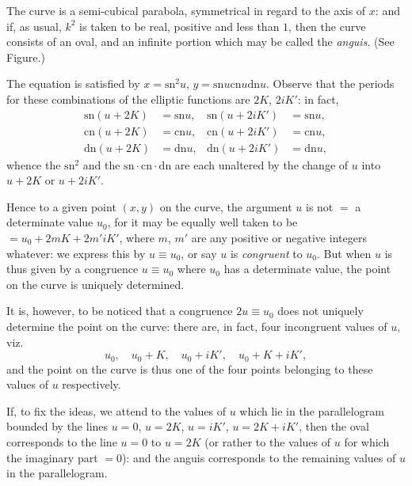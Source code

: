 \documentclass[11pt,a4paper]{book}
\providecommand{\sn}{\mathrm{sn}}
\providecommand{\cn}{\mathrm{cn}}
\providecommand{\dn}{\mathrm{dn}}
\begin{document}
\begin{art}\label{art:120}
The curve is a semi-cubical parabola, symmetrical in regard to the axis of $x$: and if, as usual, $k^2$ is taken to be real, positive and less than $1$, then the curve consists of an oval, and an infinite portion which may be called the \textit{anguis}. (See Figure.)

The equation is satisfied by $x = \sn^2 u$, $y = \sn u \cn u \dn u$. Observe that the periods for these combinations of the elliptic functions are $2K$, $2iK'$: in fact,
\begin{align*}
\sn(u + 2K) &= \sn u, & \sn(u + 2iK') &= \sn u,\\
\cn(u + 2K) &= \cn u, & \cn(u + 2iK') &= \cn u,\\
\dn(u + 2K) &= \dn u, & \dn(u + 2iK') &= \dn u,
\end{align*}
whence the $\sn^2$ and the $\sn \cdot \cn \cdot \dn$ are each unaltered by the change of $u$ into $u + 2K$ or $u + 2iK'$.

Hence to a given point $(x, y)$ on the curve, the argument $u$ is not $=$ a determinate value $u_0$, for it may be equally well taken to be $= u_0 + 2mK + 2m'iK'$, where $m$, $m'$ are any positive or negative integers whatever: we express this by $u \equiv u_0$, or say $u$ is \textit{congruent} to $u_0$. But when $u$ is thus given by a congruence $u \equiv u_0$ where $u_0$ has a determinate value, the point on the curve is uniquely determined.

It is, however, to be noticed that a congruence $2u \equiv u_0$ does not uniquely determine the point on the curve: there are, in fact, four incongruent values of $u$, viz.
\[
u_0, \quad u_0 + K, \quad u_0 + iK', \quad u_0 + K + iK',
\]
and the point on the curve is thus one of the four points belonging to these values of $u$ respectively.
\end{art}

\newpage
\begin{art}\label{art:121}
If, to fix the ideas, we attend to the values of $u$ which lie in the parallelogram bounded by the lines $u = 0$, $u = 2K$, $u = iK'$, $u = 2K + iK'$, then the oval corresponds to the line $u = 0$ to $u = 2K$ (or rather to the values of $u$ for which the imaginary part $= 0$): and the anguis corresponds to the remaining values of $u$ in the parallelogram.
\end{art}
\end{document}
